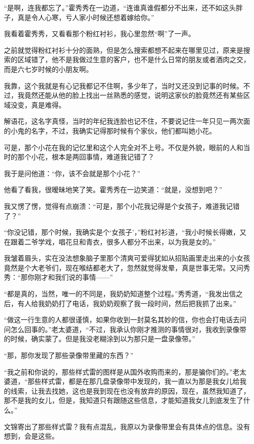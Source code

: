 “是啊，连我都忘了。”霍秀秀在一边道，“连谁真谁假都分不出来，还不如这头胖子，真是令人心寒，亏人家小时候还想着嫁给你。”

我看着霍秀秀，又看看那个粉红衬衫，我心里忽然“啊”了一声。

之前就觉得粉红衬衫十分的面熟，但是怎么搜索都想不起来在哪里见过，原来是搜索的区域错了，他不是我做过生意的客户，也不是什么日常的朋友或者酒肉之交，而是六七岁时候的小朋友啊。

我靠，这个我就是有心记我都记不住啊，多少年了，当时又还没到记事的时候。不过，我竟然还能从他的脸上找出一丝熟悉的感觉，说明这家伙的脸竟然还有某些区域没变，真是难得。

解语花，这名字真怪，当时的年纪我连脸也记不住，不要说记住一年只见一两次面的小鬼的名字，不过，我确实记得那时候有个家伙，他们都叫她小花。

可是，那个小花在我的记忆里和这个人完全对不上号。不仅是外貌，眼前的人和当时的那个小花，根本是两回事情，难道我记错了？

我于是问他道：“你，该不会就是那个小花？”

他看了看我，很暧昧地笑了笑。霍秀秀在一边笑道：“就是，没想到吧？”

我又愣了愣，觉得有点崩溃：“可是，那个小花我记得是个女孩子，难道我记错了？”

“你没记错，那个时候，我确实是个‘女孩子’，”粉红衬衫道，“我小时候长得嫩，又在跟着二爷学戏，唱花旦和青衣，很多人都分不出来，以为我是女的。”

我皱着眉头，实在没法想象脑子里那个清爽可爱得犹如从招贴画里走出来的小女孩竟然是个大老爷们，现在喉结都老大了，忽然就觉得发晕，真是世事无常。又问秀秀：“那你刚才和我们说的事情——”

“都是真的，当然，唯一的不同是，我奶奶知道整个过程。”秀秀道，“我发出信之后，有人给我奶奶打了电话，我奶奶观察了我一段时间，然后把我抓了出来。”

“做这一行生意的人都很谨慎，如果你收到一封莫名其妙的信，你也会打电话去问问怎么回事的。”老太婆道，“不过，我承认你刚才推测的事情很对，我收到录像带的时候，确实蒙了。但是我没老糊涂到以为那只是一盘录像带。”

“那，那你发现了那些录像带里藏的东西？”

“我之前和你说的，那些样式雷的图样是从国外收购而来的，那是骗你们的。”老太婆道，“那些样式雷，都是在那几盘录像带中发现的，我一直以为那是我女儿给我的线索，让我去找她，这也是我到现在也没有放弃的原因，现在，虽然我知道了，那不是我的女儿，但是，我知道只有跟随这些信息，才能知道我女儿到底发生了什么。”

文锦寄出了那些样式雷？我有点混乱，我原以为录像带里会有具体点的信息。没有想到，会是这些。

